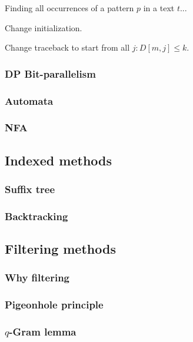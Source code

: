 Finding all occurrences of a pattern $p$ in a text $t$...

Change initialization.

Change traceback to start from all $j : D[m,j] \leq k$.


\subsubsection{DP Bit-parallelism}


\subsubsection{Automata}

\subsubsection{NFA}



\subsection{Indexed methods}

\subsubsection{Suffix tree}

\subsubsection{Backtracking}


\subsection{Filtering methods}

\subsubsection{Why filtering}

\subsubsection{Pigeonhole principle}

\subsubsection{$q$-Gram lemma}

